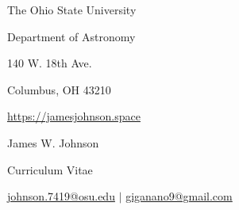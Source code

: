 \documentclass[cv.tex]{subfiles}
\begin{document}
\begin{center}
\parbox{.3\textwidth}{%
	\raggedleft
	The Ohio State University \par
	Department of Astronomy \par
	140 W. 18th Ave. \par
	Columbus, OH 43210 \par
	\url{https://jamesjohnson.space}
}
\hspace{1mm}
\vrule height 1.5cm width 0.4pt
\hspace{1mm}
\parbox{0.5\textwidth}{%
	{%
	\fontsize{30}{36} \selectfont James W. Johnson \par
	\fontsize{18}{25} \selectfont Curriculum Vitae \par
	\fontsize{11}{13} \selectfont
	\vspace{0.08cm}
	\href{mailto:johnson.7419@osu.edu}{johnson.7419@osu.edu} $\vert$
	\href{mailto:giganano9@gmail.com}{giganano9@gmail.com}
	}
}
\end{center}
\end{document}
